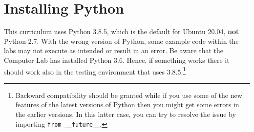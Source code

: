 \label{pythoninstall}

%
%
%
%
%
%
%


\section*{Installing Python}


\begin{warn}
This curriculum uses Python 3.8.5, which is the default for Ubuntu
20.04, \textbf{not} Python 2.7.  With the wrong version of Python, some
example code within the labs may not execute as intended or result in an
error. Be aware that the Computer Lab has installed Python 3.6. Hence,
if something works there it should work also in the testing environment
that uses 3.8.5.\footnote{Backward compatibility should be granted while
if you use some of the new features of the latest versions of Python
then you might get some errors in the earlier versions. In this latter
case, you can try to resolve the issue by importing \lstinline{from
__future__}.}
\end{warn}

